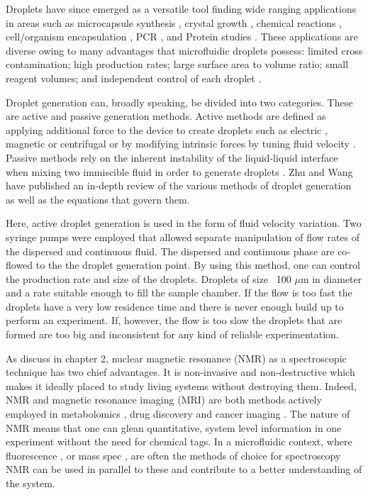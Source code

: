 Droplets have since emerged as a versatile tool finding wide ranging applications in areas
such as microcapsule synthesis \citep{RN105}, crystal growth \citep{RN106}, chemical reactions
\citep{RN114}, cell/organism encapsulation \citep{RN107,RN108, RN113}, PCR \citep{RN109,
RN110}, and Protein studies \citep{RN111, RN112}. These applications are diverse owing to many
advantages that microfluidic droplets possess: limited cross contamination; high production
rates; large surface area to volume ratio; small reagent volumes; and independent control of
each droplet \citep{RN102}.

Droplet generation can, broadly speaking, be divided into two categories. These are active
and passive generation methods. Active methods are defined as applying additional force to
the device to create droplets such as electric \citep{RN116}, magnetic \citep{RN117} or
centrifugal \citep{RN11} or by modifying intrinsic forces by tuning fluid
velocity \citep{RN58}. Passive methods rely on the inherent instability of the liquid-liquid
interface when mixing two immiscible fluid in order to generate droplets \citep{RN120, RN121,
RN122}. Zhu and Wang \citep{RN123} have published an in-depth review of the various methods of
droplet generation as well as the equations that govern them.

Here, active droplet generation is used in the form of fluid velocity variation. Two
syringe pumps were employed that allowed separate manipulation of flow rates of the dispersed
and continuous fluid. The dispersed and continuous phase are co-flowed to the the droplet
generation point. By using this method, one can control the production rate and size of the
droplets. Droplets of size ~100 $\mu\text{m}$ in diameter and a rate suitable enough to fill
the sample chamber. If the flow is too fast the droplets have a very low residence time and
there is never enough build up to perform an experiment. If, however, the flow is too slow
the droplets that are formed are too big and inconsistent for any kind of reliable
experimentation.

As discuss in chapter 2, nuclear magnetic resonance (NMR) as a spectroscopic technique has two chief advantages. It is
non-invasive and non-destructive which makes it ideally placed to study living systems without
destroying them. Indeed, NMR and magnetic resonance imaging (MRI) are both methods actively
employed in metabolomics \citep{RN124}, drug discovery \citep{RN125} and cancer
imaging \citep{RN126}. The nature of NMR means that one can glean quantitative, system
level information in one experiment without the need for chemical tags. In a microfluidic
context, where fluorescence \citep{horrocks2015fast, schlimpert2016fluorescence}, or
mass spec \citep{redman2016characterization,choi2016digital}, are often the methods of choice
for spectroscopy NMR can be used in parallel to these and contribute to a better understanding of the system.

